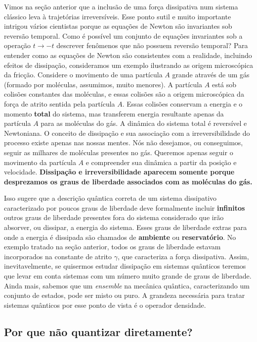 \documentclass{article}
\begin{document}
Vimos na seção anterior que a inclusão de uma força dissipativa num sistema clássico leva à trajetórias irreversíveis. Esse ponto sutil e muito importante intrigou vários cientistas porque as equações de Newton são invariantes sob reversão temporal. Como é possível um conjunto de equações invariantes sob a operação $t\rightarrow -t$ descrever fenômenos que não possuem reversão temporal? Para entender como as equações de Newton são consistentes com a realidade, incluindo efeitos de dissipação, consideramos um exemplo ilustrando as origem microscópica da fricção. Considere o movimento de uma partícula $A$ grande através de um gás (formado por moléculas, assumimos, muito menores). A partícula $A$ está sob colisões constantes das moléculas, e essas colisões são a origem microscópica da força de atrito sentida pela partícula $A$. Essas colisões conservam a energia e o momento \textbf{total} do sistema, mas transferem energia resultante apenas da partícula $A$ para as moléculas do gás. A dinâmica do sistema total é reversível e Newtoniana. O conceito de dissipação e sua associação com a irreversibilidade do processo existe apenas nas nossas mentes. Nós não desejamos, ou conseguimos, seguir as milhares de moléculas presentes no gás. Queremos apenas seguir o movimento da partícula $A$ e compreender sua dinâmica a partir da posição e velocidade. \textbf{Dissipação e irreversibilidade aparecem somente porque desprezamos os graus de liberdade associados com as moléculas do gás.}

Isso sugere que a descrição quântica correta de um sistema dissipativo caracterizado por poucos graus de liberdade deve formalmente incluir \textbf{infinitos} outros graus de liberdade presentes fora do sistema considerado que irão absorver, ou dissipar, a energia do sistema. Esses graus de liberdade extras para onde a energia é dissipada são chamados de \textbf{ambiente} ou \textbf{reservatório}. No exemplo tratado na seção anterior, todos os graus de liberdade estavam incorporados na constante de atrito $\gamma$, que caracteriza a força dissipativa. Assim, inevitavelmente, se quisermos estudar dissipação em sistemas quânticos teremos que levar em conta sistemas com um número muito grande de graus de liberdade. Ainda mais, sabemos que um \textit{ensemble} na mecânica quântica, caracterizando um conjunto de estados, pode ser misto ou puro. A grandeza necessária para tratar sistemas quânticos por esse ponto de vista é o operador densidade.

\subsection{Por que não quantizar diretamente?}
\end{document}
